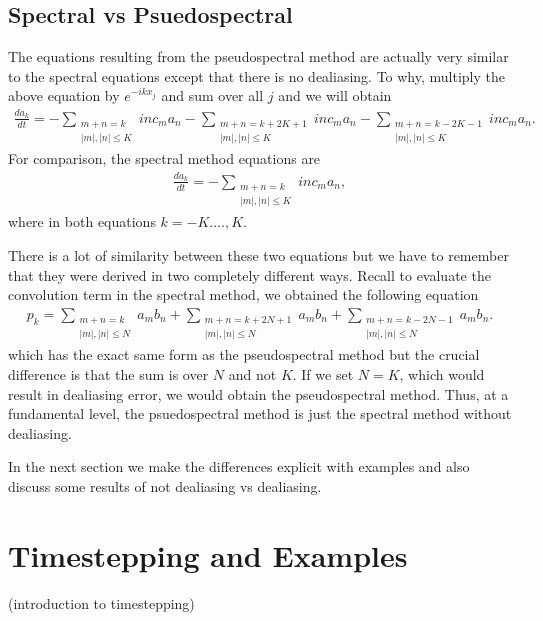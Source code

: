 \subsection{Spectral vs Psuedospectral}
The equations resulting from the pseudospectral method are actually very similar to the spectral equations except that there is no dealiasing. To why, multiply the above equation by $e^{-ikx_{j}}$ and sum over all $j$ and we will obtain
\begin{align}
\frac{da_{k}}{dt}= -\sum_{\substack{m+n=k\\ |m|,|n|\le K}}inc_{m}a_{n}-\sum_{\substack{m+n=k+2K+1\\ |m|,|n|\le K}}inc_{m}a_{n}- \sum_{\substack{m+n=k-2K-1\\ |m|,|n|\le K}}inc_{m}a_{n}.
\end{align}
For comparison, the spectral method equations are
\begin{align} 
\frac{da_{k}}{dt} = -\sum_{\substack{m+n=k\\ |m|,|n|\le K}} inc_{m}a_{n},
\end{align}
where in both equations $k=-K.\ldots,K$. 

There is a lot of similarity between these two equations but we have to remember that they were derived in two completely different ways. Recall to evaluate the convolution term in the spectral method, we obtained the following equation
\begin{align}
p_{k} = \sum_{\substack{m+n=k\\ |m|,|n|\le N}}a_{m}b_{n}+  \sum_{\substack{m+n=k+2N+1\\ |m|,|n|\le N}}a_{m}b_{n}+ \sum_{\substack{m+n=k-2N-1\\ |m|,|n|\le N}}a_{m}b_{n}.
\end{align}
which has the exact same form as the pseudospectral method but the crucial difference is that the sum is over $N$ and not $K$. If we set $N=K$, which would result in dealiasing error, we would obtain the pseudospectral method. Thus, at a fundamental level, the psuedospectral method is just the spectral method without dealiasing.

In the next section we make the differences explicit with examples and also discuss some results of not dealiasing vs dealiasing. 

\section{Timestepping and Examples}
(introduction to timestepping)

